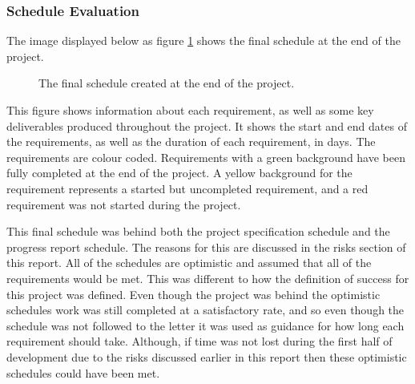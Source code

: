 \documentclass{article}
\begin{document}
\subsubsection{Schedule Evaluation}

The image displayed below as figure \ref{figure:finalSchedule} shows the final schedule at the end of the project. 

\begin{figure}[H]
	\centering
	\caption{The final schedule created at the end of the project.}
	\label{figure:finalSchedule}
\end{figure} 

This figure shows information about each requirement, as well as some key deliverables produced throughout the project. It shows the start and end dates of the requirements, as well as the duration of each requirement, in days. The requirements are colour coded. Requirements with a green background have been fully completed at the end of the project. A yellow background for the requirement represents a started but uncompleted requirement, and a red requirement was not started during the project. \par

This final schedule was behind both the project specification schedule and the progress report schedule. The reasons for this are discussed in the risks section of this report. All of the schedules are optimistic and assumed that all of the requirements would be met. This was different to how the definition of success for this project was defined. Even though the project was behind the optimistic schedules work was still completed at a satisfactory rate, and so even though the schedule was not followed to the letter it was used as guidance for how long each requirement should take. Although, if time was not lost during the first half of development due to the risks discussed earlier in this report then these optimistic schedules could have been met. \par
\end{document}
